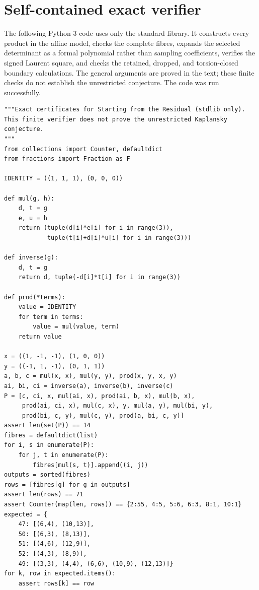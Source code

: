 \documentclass[11pt,a4paper,oneside]{report}
\theoremstyle{definition}
\theoremstyle{remark}
\begin{document}
\begingroup\raggedright

\endgroup


\section{Self-contained exact verifier}
\label{M06:app:code}
The following Python 3 code uses only the standard library.
It constructs every product in the affine model, checks the
complete fibres, expands the selected determinant as a formal
polynomial rather than sampling coefficients, verifies the
signed Laurent square, and checks the retained, dropped, and
torsion-closed boundary calculations. The general arguments
are proved in the text; these finite checks do not establish
the unrestricted conjecture. The code was run successfully.

\begin{lstlisting}
"""Exact certificates for Starting from the Residual (stdlib only).
This finite verifier does not prove the unrestricted Kaplansky conjecture.
"""
from collections import Counter, defaultdict
from fractions import Fraction as F

IDENTITY = ((1, 1, 1), (0, 0, 0))

def mul(g, h):
    d, t = g
    e, u = h
    return (tuple(d[i]*e[i] for i in range(3)),
            tuple(t[i]+d[i]*u[i] for i in range(3)))

def inverse(g):
    d, t = g
    return d, tuple(-d[i]*t[i] for i in range(3))

def prod(*terms):
    value = IDENTITY
    for term in terms:
        value = mul(value, term)
    return value

x = ((1, -1, -1), (1, 0, 0))
y = ((-1, 1, -1), (0, 1, 1))
a, b, c = mul(x, x), mul(y, y), prod(x, y, x, y)
ai, bi, ci = inverse(a), inverse(b), inverse(c)
P = [c, ci, x, mul(ai, x), prod(ai, b, x), mul(b, x),
     prod(ai, ci, x), mul(c, x), y, mul(a, y), mul(bi, y),
     prod(bi, c, y), mul(c, y), prod(a, bi, c, y)]
assert len(set(P)) == 14
fibres = defaultdict(list)
for i, s in enumerate(P):
    for j, t in enumerate(P):
        fibres[mul(s, t)].append((i, j))
outputs = sorted(fibres)
rows = [fibres[g] for g in outputs]
assert len(rows) == 71
assert Counter(map(len, rows)) == {2:55, 4:5, 5:6, 6:3, 8:1, 10:1}
expected = {
    47: [(6,4), (10,13)],
    50: [(6,3), (8,13)],
    51: [(4,6), (12,9)],
    52: [(4,3), (8,9)],
    49: [(3,3), (4,4), (6,6), (10,9), (12,13)]}
for k, row in expected.items():
    assert rows[k] == row


\end{lstlisting}
\end{document}
